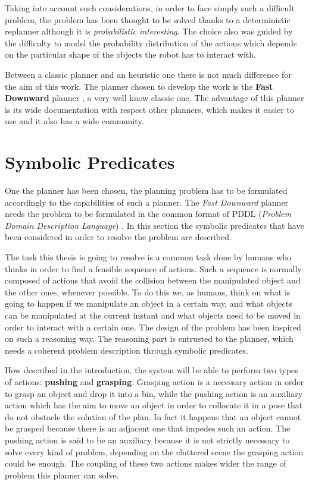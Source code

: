 Taking into account such considerations, in order to face simply such a difficult problem, the problem has been thought to be solved thanks to a deterministic replanner although it is \textit{probabilistic interesting}. The choice also was guided by the difficulty to model the probability distribution of the actions which depends on the particular shape of the objects the robot has to interact with. 

Between a classic planner and an heuristic one there is not much difference for the aim of this work.
The planner chosen to develop the work is the \textbf{Fast Downward} planner \cite{helmert2006fast}\cite{FastDownwardPage}, a very well know classic one. The advantage of this planner is its wide documentation with respect other planners, which makes it easier to use and it also has a wide community. 

\section{Symbolic Predicates}
One the planner has been chosen, the planning problem has to be formulated accordingly to the capabilities of such a planner. The \textit{Fast Downward} planner needs the problem to be formulated in the common format of PDDL (\textit{Problem Domain Description Language}) \citep{pddl}. In this section the symbolic predicates that have been considered in order to resolve the problem are described.

The task this thesis is going to resolve is a common task done by humans who thinks in order to find a feasible sequence of actions. Such a sequence is normally composed of actions that avoid the collision between the manipulated object and the other ones, whenever possible. To do this we, as humans, think on what is going to happen if we manipulate an object in a certain way, and what objects can be manipulated at the current instant and what objects need to be moved in order to interact with a certain one. The design of the problem has been inspired on such a reasoning way. The reasoning part is entrusted to the planner, which needs a coherent problem description through symbolic predicates. 

How described in the introduction, the system will be able to perform two types of actions: \textbf{pushing} and \textbf{grasping}.
Grasping action is a necessary action in order to grasp an object and drop it into a bin, while the pushing action is an auxiliary action which has the aim to move an object in order to collocate it in a pose that do not obstacle the solution of the plan. In fact it happens that an object cannot be grasped because there is an adjacent one that impedes such an action.
The pushing action is said to be an auxiliary because it is not strictly necessary to solve every kind of problem, depending on the cluttered scene the grasping action could be enough.
The coupling of these two actions makes wider the range of problem this planner can solve.    

